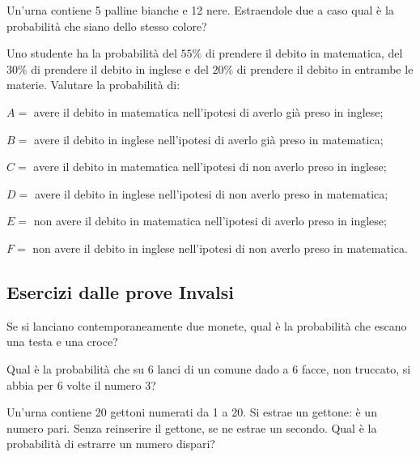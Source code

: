 \begin{esercizio}[\Ast]
 \label{ese:9.62}
Un'urna contiene 5 palline bianche e 12 nere. Estraendole due a caso qual è la probabilità che siano dello stesso colore?
\end{esercizio}

\begin{esercizio}[\Ast]
 \label{ese:9.63}
Uno studente ha la probabilità del $55\%$ di prendere il debito in matematica, del $30\%$ di prendere il debito in inglese e del $20\%$ di prendere il debito in entrambe le materie. Valutare la probabilità di:
\begin{description*}
\item $ A= $ avere il debito in matematica nell'ipotesi di averlo già preso in inglese;
\item $ B= $ avere il debito in inglese nell'ipotesi di averlo già preso in matematica;
\item $ C= $ avere il debito in matematica nell'ipotesi di non averlo preso in inglese;
\item $ D= $ avere il debito in inglese nell'ipotesi di non averlo preso in matematica;
\item $ E= $ non avere il debito in matematica nell'ipotesi di averlo preso in inglese;
\item $ F= $ non avere il debito in inglese nell'ipotesi di non averlo preso in matematica.
\end{description*}
\end{esercizio}

\subsection*{Esercizi dalle prove Invalsi}

\begin{esercizio}[2005~\Ast]
\label{ese:9.64}
Se si lanciano contemporaneamente due monete, qual è la probabilità che escano una testa e una croce?
\end{esercizio}

\begin{esercizio}[2005~\Ast]
\label{ese:9.65}
Qual è la probabilità che su 6 lanci di un comune dado a 6 facce, non truccato, si abbia per 6 volte il numero 3?
\end{esercizio}

\begin{esercizio}[2005~\Ast]
\label{ese:9.66}
Un'urna contiene 20 gettoni numerati da 1 a 20. Si estrae un gettone: è un numero pari. Senza reinserire il gettone, se ne estrae un secondo. Qual è la probabilità di estrarre un numero dispari?
\end{esercizio}

